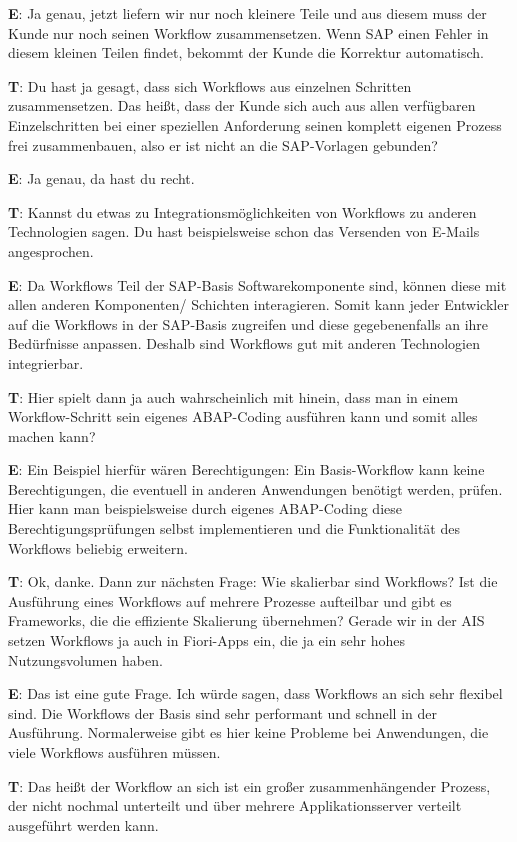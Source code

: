 \begin{list}{X:}{\setlength{\labelsep}{5mm}}
 \item[\textbf{E}:] Ja genau, jetzt liefern wir nur noch kleinere Teile und aus diesem muss der Kunde nur noch seinen Workflow zusammensetzen. Wenn SAP einen Fehler in diesem kleinen Teilen findet, bekommt der Kunde die Korrektur automatisch.
 \item[\textbf{T}:] Du hast ja gesagt, dass sich Workflows aus einzelnen Schritten zusammensetzen. Das hei{\ss}t, dass der Kunde sich auch aus allen verfügbaren Einzelschritten bei einer speziellen Anforderung seinen komplett eigenen Prozess frei zusammenbauen, also er ist nicht an die SAP-Vorlagen gebunden?
 \item[\textbf{E}:] Ja genau, da hast du recht.
 \item[\textbf{T}:] Kannst du etwas zu Integrationsmöglichkeiten von Workflows zu anderen Technologien sagen. Du hast beispielsweise schon das Versenden von E-Mails angesprochen.
 \item[\textbf{E}:] Da Workflows Teil der SAP-Basis Softwarekomponente sind, können diese mit allen anderen Komponenten/ Schichten interagieren. Somit kann jeder Entwickler auf die Workflows in der SAP-Basis zugreifen und diese gegebenenfalls an ihre Bedürfnisse anpassen. Deshalb sind Workflows gut mit anderen Technologien integrierbar.
 \item[\textbf{T}:] Hier spielt dann ja auch wahrscheinlich mit hinein, dass man in einem Workflow-Schritt sein eigenes ABAP-Coding ausführen kann und somit alles machen kann?
 \item[\textbf{E}:] Ein Beispiel hierfür wären Berechtigungen: Ein Basis-Workflow kann keine Berechtigungen, die eventuell in anderen Anwendungen benötigt werden, prüfen. Hier kann man beispielsweise durch eigenes ABAP-Coding diese Berechtigungsprüfungen selbst implementieren und die Funktionalität des Workflows beliebig erweitern.
 \item[\textbf{T}:] Ok, danke. Dann zur nächsten Frage: Wie skalierbar sind Workflows? Ist die Ausführung eines Workflows auf mehrere Prozesse aufteilbar und gibt es Frameworks, die die effiziente Skalierung übernehmen? Gerade wir in der AIS setzen Workflows ja auch in Fiori-Apps ein, die ja ein sehr hohes Nutzungsvolumen haben.
 \item[\textbf{E}:] Das ist eine gute Frage. Ich würde sagen, dass Workflows an sich sehr flexibel sind. Die Workflows der Basis sind sehr performant und schnell in der Ausführung. Normalerweise gibt es hier keine Probleme bei Anwendungen, die viele Workflows ausführen müssen.
 \item[\textbf{T}:] Das hei{\ss}t der Workflow an sich ist ein gro{\ss}er zusammenhängender Prozess, der nicht nochmal unterteilt und über mehrere Applikationsserver verteilt ausgeführt werden kann.

\end{list}
